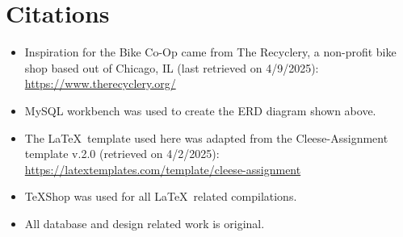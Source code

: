 \documentclass{article}
\begin{document}
\vspace{0.5cm}

\section{Citations}
\begin{tcolorbox}[colback=secondarycolor, colframe=primarycolor, arc=5mm]
\begin{itemize}
  \item Inspiration for the Bike Co-Op came from The Recyclery, a non-profit bike shop based out of Chicago, IL (last retrieved on 4/9/2025): \href{https://www.therecyclery.org/}{https://www.therecyclery.org/}
  
  \vspace{0.2cm}
  
  \item MySQL workbench was used to create the ERD diagram shown above.
  
  \vspace{0.2cm}
  
  \item The \LaTeX\ template used here was adapted from the Cleese-Assignment template v.2.0 (retrieved on 4/2/2025): \href{https://latextemplates.com/template/cleese-assignment}{https://latextemplates.com/template/cleese-assignment}
  
  \vspace{0.2cm}
  
  \item TeXShop was used for all \LaTeX\ related compilations.
  
  \vspace{0.2cm}
  
  \item All database and design related work is original.
\end{itemize}
\end{tcolorbox}
\end{document}
